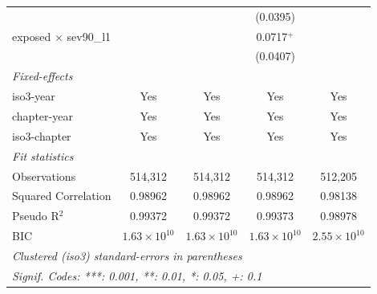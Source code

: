 \begin{tabular}{lcccc}
                                &                       &                       & (0.0395)              &   \\   
   exposed $\times$ sev90\_l1   &                       &                       & 0.0717$^{+}$          &   \\   
                                &                       &                       & (0.0407)              &   \\   
   \midrule
   \emph{Fixed-effects}\\
   iso3-year                    & Yes                   & Yes                   & Yes                   & Yes\\  
   chapter-year                 & Yes                   & Yes                   & Yes                   & Yes\\  
   iso3-chapter                 & Yes                   & Yes                   & Yes                   & Yes\\  
   \midrule
   \emph{Fit statistics}\\
   Observations                 & 514,312               & 514,312               & 514,312               & 512,205\\  
   Squared Correlation          & 0.98962               & 0.98962               & 0.98962               & 0.98138\\  
   Pseudo R$^2$                 & 0.99372               & 0.99372               & 0.99373               & 0.98978\\  
   BIC                          & $1.63\times 10^{10}$  & $1.63\times 10^{10}$  & $1.63\times 10^{10}$  & $2.55\times 10^{10}$\\   
   \midrule \midrule
   \multicolumn{5}{l}{\emph{Clustered (iso3) standard-errors in parentheses}}\\
   \multicolumn{5}{l}{\emph{Signif. Codes: ***: 0.001, **: 0.01, *: 0.05, +: 0.1}}\\
\end{tabular}
\par\endgroup


